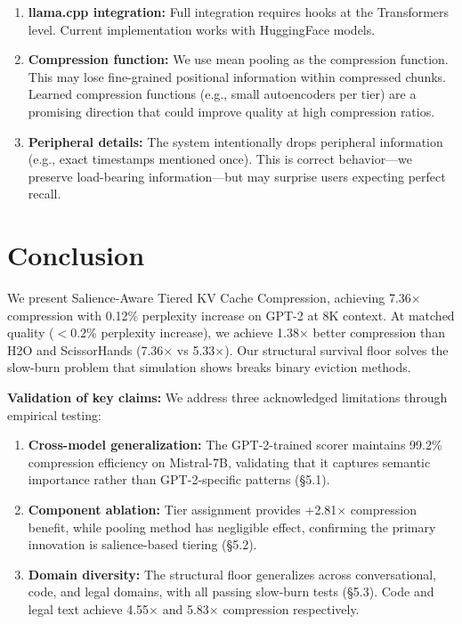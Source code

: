 \documentclass[11pt]{article}
\begin{document}
\begin{enumerate}
\item \textbf{llama.cpp integration:} Full integration requires hooks at the Transformers level. Current implementation works with HuggingFace models.

\item \textbf{Compression function:} We use mean pooling as the compression function. This may lose fine-grained positional information within compressed chunks. Learned compression functions (e.g., small autoencoders per tier) are a promising direction that could improve quality at high compression ratios.

\item \textbf{Peripheral details:} The system intentionally drops peripheral information (e.g., exact timestamps mentioned once). This is correct behavior---we preserve load-bearing information---but may surprise users expecting perfect recall.
\end{enumerate}

\section{Conclusion}

We present Salience-Aware Tiered KV Cache Compression, achieving 7.36$\times$ compression with 0.12\% perplexity increase on GPT-2 at 8K context. At matched quality ($<$0.2\% perplexity increase), we achieve 1.38$\times$ better compression than H2O and ScissorHands (7.36$\times$ vs 5.33$\times$). Our structural survival floor solves the slow-burn problem that simulation shows breaks binary eviction methods.

\textbf{Validation of key claims:} We address three acknowledged limitations through empirical testing:
\begin{enumerate}
    \item \textbf{Cross-model generalization:} The GPT-2-trained scorer maintains 99.2\% compression efficiency on Mistral-7B, validating that it captures semantic importance rather than GPT-2-specific patterns (\S5.1).
    \item \textbf{Component ablation:} Tier assignment provides +2.81$\times$ compression benefit, while pooling method has negligible effect, confirming the primary innovation is salience-based tiering (\S5.2).
    \item \textbf{Domain diversity:} The structural floor generalizes across conversational, code, and legal domains, with all passing slow-burn tests (\S5.3). Code and legal text achieve 4.55$\times$ and 5.83$\times$ compression respectively.
\end{enumerate}
\end{document}
